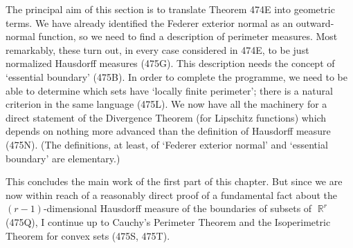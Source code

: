 
\def\chaptername{Geometric measure theory}
\def\sectionname{The essential boundary}


The principal aim of this section is to translate Theorem 474E into
geometric terms.   We have already identified the Federer exterior
normal as an outward-normal function, so we need to
find a description of perimeter measures.   Most remarkably, these turn
out, in every case considered in 474E,
to be just normalized Hausdorff measures (475G).   This
description needs the
concept of `essential boundary' (475B).   In order to complete the
programme, we need to be able to determine which sets have `locally
finite perimeter';  there is a natural criterion in the same language
(475L).   We now have all the machinery for a direct statement of the
Divergence Theorem (for Lipschitz functions) which depends on nothing
more advanced than the definition of Hausdorff measure (475N).   (The
definitions, at least, of `Federer exterior normal' and `essential
boundary' are elementary.)

This concludes the main work of the first part of this chapter.   But
since we are now
within reach of a reasonably direct proof of a fundamental fact about
the $(r-1)$-dimensional Hausdorff measure of the boundaries of subsets
of
$\BbbR^r$ (475Q), I continue up to Cauchy's Perimeter Theorem and the
Isoperimetric Theorem for convex sets (475S, 475T).



